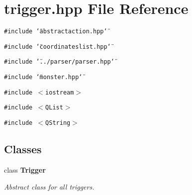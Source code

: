 \section{trigger.hpp File Reference}
\label{trigger_8hpp}
{\tt \#include \char`\"{}abstractaction.hpp\char`\"{}}\par
{\tt \#include \char`\"{}coordinateslist.hpp\char`\"{}}\par
{\tt \#include \char`\"{}../parser/parser.hpp\char`\"{}}\par
{\tt \#include \char`\"{}monster.hpp\char`\"{}}\par
{\tt \#include $<$iostream$>$}\par
{\tt \#include $<$QList$>$}\par
{\tt \#include $<$QString$>$}\par
\subsection*{Classes}
\begin{CompactItemize}
\item 
class {\bf Trigger}
\begin{CompactList}\small\item\em Abstract class for all triggers. \item\end{CompactList}\end{CompactItemize}

